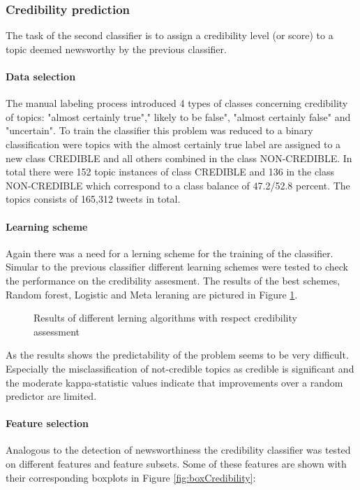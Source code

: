 \documentclass{proseminar}
\begin{document}
\subsubsection*{Credibility prediction}
The task of the second classifier is to assign a credibility level (or score) to a topic deemed newsworthy by the previous classifier.

\paragraph{Data selection}
The manual labeling process introduced 4 types of classes concerning credibility of topics:  "almost certainly true"," likely to be false",  "almost certainly false" and "uncertain". To train the classifier this problem was reduced to a binary classification were topics with the almost certainly true label are assigned to a new class CREDIBLE and all others combined in the class NON-CREDIBLE.
In total there were 152 topic instances of class CREDIBLE and 136 in the class NON-CREDIBLE which correspond to a class balance of 47.2/52.8 percent. The topics consists of  165,312 tweets in total. 


\paragraph{Learning scheme}
Again there was a need for a lerning scheme for the training of the classifier. Simular to the previous classifier different learning schemes were tested to check the performance on the credibility assesment. The results of the best schemes, Random forest, Logistic and Meta leraning are pictured in Figure \ref{fig:schemeCredibility}.

\begin{figure}[h]
\centering
{}
\caption{Results of different lerning algorithms with respect credibility assessment}
\label{fig:schemeCredibility}
\end{figure}

As the results shows the predictability of the problem seems to be very difficult. Especially the misclassification of not-credible topics as credible is significant and the moderate kappa-statistic values indicate that improvements over a random predictor are limited.

\paragraph{Feature selection}
Analogous to the detection of newsworthiness the credibility classifier was tested on different features and feature subsets. Some of these features are shown with their corresponding boxplots in Figure \ref{fig:boxCredibility}:
\end{document}
